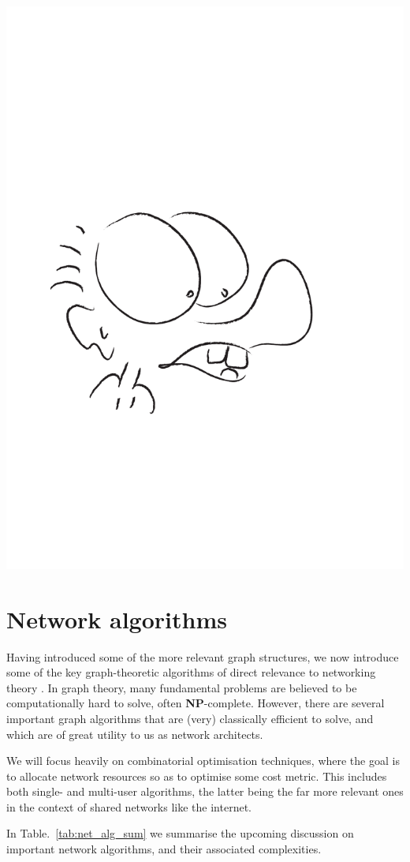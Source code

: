 \documentclass[aps, rmp, twocolumn, amsmath, amssymb, nofootinbib, superscriptaddress, longbibliography, floatfix, table-of-contents, eqsecnum]{revtex4-1}
\begin{document}
\begin{center}
	\includegraphics[width=0.6\columnwidth]{sketch_20}
\end{center}

%
%

\section{Network algorithms} \label{sec:graph_theory} 

Having introduced some of the more relevant graph structures, we now introduce some of the key graph-theoretic algorithms of direct relevance to networking theory \cite{bib:RivestAlgBook}. In graph theory, many fundamental problems are believed to be computationally hard to solve, often \textbf{NP}-complete. However, there are several important graph algorithms that are (very) classically efficient to solve, and which are of great utility to us as network architects.

We will focus heavily on combinatorial optimisation techniques, where the goal is to allocate network resources so as to optimise some cost metric. This includes both single- and multi-user algorithms, the latter being the far more relevant ones in the context of shared networks like the internet.

In Table.~\ref{tab:net_alg_sum} we summarise the upcoming discussion on important network algorithms, and their associated complexities.
\end{document}
